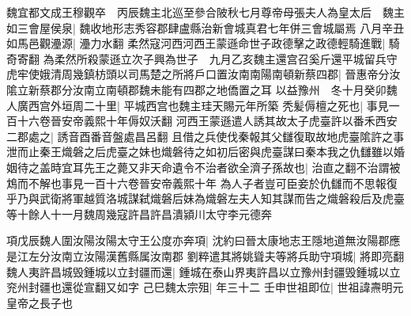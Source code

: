 魏宜都文成王穆觀卒　丙辰魏主北巡至參合陂秋七月尊帝母張夫人為皇太后　魏主如三會屋侯泉|{
	魏收地形志秀容郡肆盧縣治新會城真君七年併三會城屬焉}
八月辛丑如馬邑觀灅源|{
	灅力水翻}
柔然寇河西河西王蒙遜命世子政德擊之政德輕騎進戰|{
	騎奇寄翻}
為柔然所殺蒙遜立次子興為世子　九月乙亥魏主還宫召奚斤還平城留兵守虎牢使娥清周幾鎮枋頭以司馬楚之所將戶口置汝南南陽南頓新蔡四郡|{
	晉惠帝分汝隂立新蔡郡分汝南立南頓郡魏未能有四郡之地僑置之耳}
以益豫州　冬十月癸卯魏人廣西宫外垣周二十里|{
	平城西宫也魏主珪天賜元年所築}
秃髪傉檀之死也|{
	事見一百十六卷晉安帝義熙十年傉奴沃翻}
河西王蒙遜遣人誘其故太子虎臺許以番禾西安二郡處之|{
	誘音酉番音盤處昌呂翻}
且借之兵使伐秦報其父讎復取故地虎臺隂許之事泄而止秦王熾磐之后虎臺之妹也熾磐待之如初后密與虎臺謀曰秦本我之仇讎雖以婚姻待之盖時宜耳先王之薨又非天命遺令不治者欲全濟子孫故也|{
	治直之翻不治謂被鴆而不解也事見一百十六卷晉安帝義熙十年}
為人子者豈可臣妾於仇讎而不思報復乎乃與武衛將軍越質洛城謀弑熾磐后妹為熾磐左夫人知其謀而告之熾磐殺后及虎臺等十餘人十一月魏周幾寇許昌許昌潰潁川太守李元德奔

項戊辰魏人圍汝陽汝陽太守王公度亦奔項|{
	沈約曰晉太康地志王隱地道無汝陽郡應是江左分汝南立汝陽漢舊縣属汝南郡}
劉粹遣其將姚聳夫等將兵助守項城|{
	將即亮翻}
魏人夷許昌城毁鍾城以立封疆而還|{
	鍾城在泰山界夷許昌以立豫州封疆毁鍾城以立兖州封疆也還從宣翻又如字}
己巳魏太宗殂|{
	年三十二}
壬申世祖即位|{
	世祖諱燾明元皇帝之長子也}


